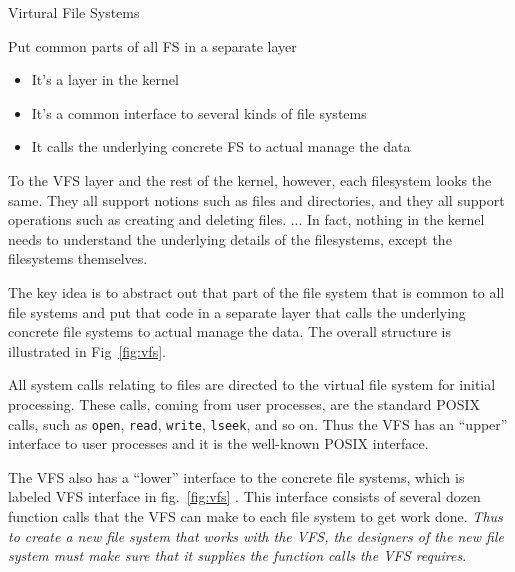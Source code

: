 \begin{frame}{Virtural File Systems}
  \begin{block}{Put common parts of all FS in a separate layer}
    \begin{itemize}
    \item It's a layer in the kernel
    \item It's a common interface to several kinds of file systems
    \item It calls the underlying concrete FS to actual manage the data
    \end{itemize}
  \end{block}
  \begin{center}\label{fig:vfs}
    \mode<beamer>{ \texttt{[image: vfs2]} }%
  \end{center}
\end{frame}

To the VFS layer and the rest of the kernel, however, each filesystem looks the same. They
all support notions such as files and directories, and they all support operations such as
creating and deleting files. ... In fact, nothing in the kernel needs to understand the
underlying details of the filesystems, except the filesystems
themselves.

The key idea is to abstract out that part of the file system that is common to all file
systems and put that code in a separate layer that calls the underlying concrete file
systems to actual manage the data. The overall structure is illustrated in
Fig~\ref{fig:vfs}.

All system calls relating to files are directed to the virtual file system for initial
processing. These calls, coming from user processes, are the standard POSIX calls, such as
\texttt{open}, \texttt{read}, \texttt{write}, \texttt{lseek}, and so on. Thus the VFS has
an ``upper'' interface to user processes and it is the well-known POSIX interface.

The VFS also has a ``lower'' interface to the concrete file systems, which is labeled VFS
interface in fig.~\ref{fig:vfs} . This interface consists of several dozen function calls
that the VFS can make to each file system to get work done. \emph{Thus to create a new
  file system that works with the VFS, the designers of the new file system must make sure
  that it supplies the function calls the VFS requires}.

